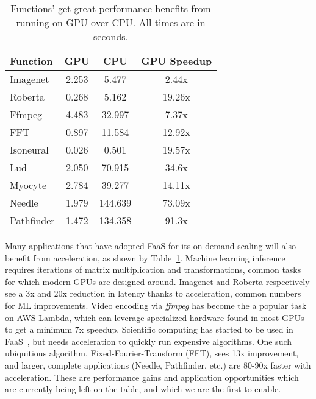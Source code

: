 \begin{table}
  \centering
  \caption{Functions' get great performance benefits from running on GPU over CPU. All times are in seconds.}
  \label{tab:gpu-cpu}
  \begin{tabular}{lccc}
    \hline
    Function & GPU & CPU & GPU Speedup \\
    \hline
  Imagenet & 2.253 & 5.477 & 2.44x \\
  Roberta & 0.268 & 5.162 & 19.26x \\
  Ffmpeg & 4.483 & 32.997 & 7.37x \\
  FFT & 0.897 & 11.584 & 12.92x \\
  Isoneural & 0.026 & 0.501 & 19.57x \\
  Lud & 2.050 & 70.915 & 34.6x \\
  Myocyte & 2.784 & 39.277 & 14.11x \\
  Needle & 1.979 & 144.639 & 73.09x \\
  Pathfinder & 1.472 & 134.358 & 91.3x \\
  \end{tabular}
\end{table}

Many applications that have adopted FaaS for its on-demand scaling will also benefit from acceleration, as shown by Table~\ref{tab:gpu-cpu}.
Machine learning inference requires iterations of matrix multiplication and transformations, common tasks for which modern GPUs are designed around.
Imagenet and Roberta respectively see a 3x and 20x reduction in latency thanks to acceleration, common numbers for ML improvements.
Video encoding via \emph{ffmpeg} has become the a popular task on AWS Lambda, which can leverage specialized hardware found in most GPUs to get a minimum 7x speedup.
Scientific computing has started to be used in FaaS~\cite{john_sweep_2019,mocskos_faaster_2018,werner2018serverless,shankar2020serverless}, but needs acceleration to quickly run expensive algorithms.
One such ubiquitious algorithm, Fixed-Fourier-Transform (FFT), sees 13x improvement, and larger, complete applications (Needle, Pathfinder, etc.) are 80-90x faster with acceleration.
These are performance gains and application opportunities which are currently being left on the table, and which we are the first to enable.


